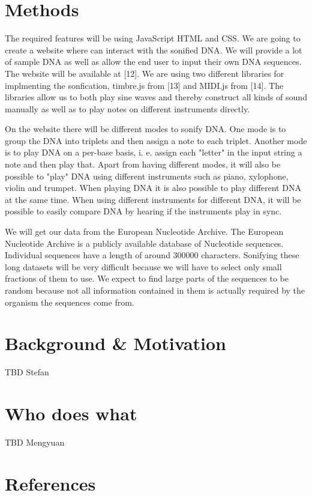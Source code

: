 \documentclass[10pt]{article}
\begin{document}
\section{Methods}

The required features will be using JavaScript HTML and CSS. We are going to create a website where can interact with the sonified DNA. We will provide a lot of sample DNA as well as allow the end user to input their own DNA sequences. The website will be available at [12]. We are using two different libraries for implmenting the sonfication, timbre.js from [13] and MIDI.js from [14]. The libraries allow us to both play sine waves and thereby construct all kinds of sound manually as well as to play notes on different instruments directly. 

On the website there will be different modes to sonify DNA. One mode is to group the DNA into triplets and then assign a note to each triplet. Another mode is to play DNA on a per-base basis, i. e. assign each "letter" in the input string a note and then play that. Apart from having different modes, it will also be possible to "play" DNA using different instruments such as piano, xylophone, violin and trumpet. When playing DNA it is also possible to play different DNA at the same time. When using different instruments for different DNA, it will be possible to easily compare DNA by hearing if the instruments play in sync. 

We will get our data from the European Nucleotide Archive. The European Nucleotide Archive is a publicly available database of Nucleotide sequences. Individual sequences have a length of around 300000 characters. Sonifying these long datasets will be very difficult because we will have to select only small fractions of them to use. We expect to find large parts of the sequences to be random because not all information contained in them is actually required by the organism the sequences come from.  

\section{Background \& Motivation}

TBD Stefan

\section{Who does what}

TBD Mengyuan

\section{References}
\end{document}
